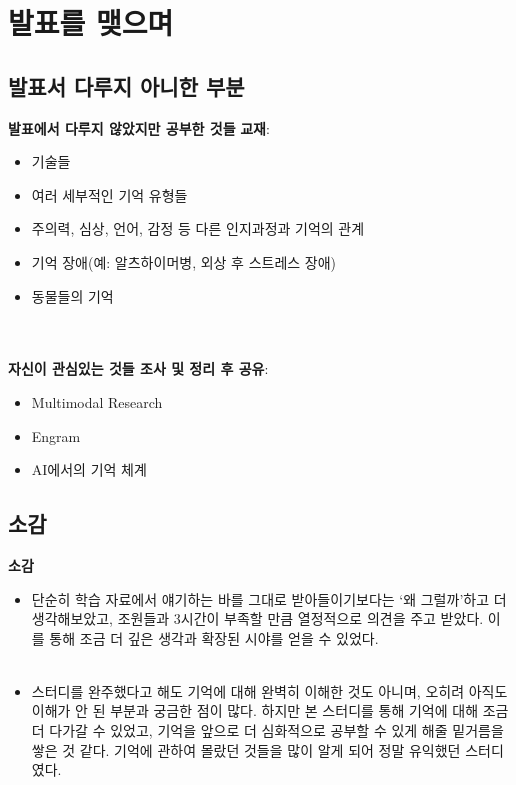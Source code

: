 \documentclass{beamer}
\begin{document}
\section{발표를 맺으며}
\subsection{발표서 다루지 아니한 부분}
\begin{frame}{\textbf{발표에서 다루지 않았지만 공부한 것들}}
  \large
  \textbf{교재}:
  \begin{itemize}
    \item 기술들
    \item 여러 세부적인 기억 유형들
    \item 주의력, 심상, 언어, 감정 등 다른 인지과정과 기억의 관계
    \item 기억 장애(예: 알츠하이머병, 외상 후 스트레스 장애)
    \item 동물들의 기억
  \end{itemize}\\~\\

  \textbf{자신이 관심있는 것들 조사 및 정리 후 공유}:
  \begin{itemize}
    \item Multimodal Research
    \item Engram
    \item AI에서의 기억 체계
  \end{itemize}
\end{frame}

\subsection{소감}
\begin{frame}{\textbf{소감}}
  \begin{itemize}
    \large
    \item 단순히 학습 자료에서 얘기하는 바를 그대로 받아들이기보다는 `왜 그럴까'하고 더 생각해보았고, 조원들과 3시간이 부족할 만큼 열정적으로 의견을 주고 받았다. 
      이를 통해 조금 더 깊은 생각과 확장된 시야를 얻을 수 있었다.\\~\\
    \item 스터디를 완주했다고 해도 기억에 대해 완벽히 이해한 것도 아니며, 오히려 아직도 이해가 안 된 부분과 궁금한 점이 많다. 하지만 본 스터디를 통해 기억에 대해 조금 더 다가갈 수 있었고, 기억을 앞으로 더 심화적으로 공부할 수 있게 해줄 밑거름을 쌓은 것 같다. 기억에 관하여 몰랐던 것들을 많이 알게 되어 정말 유익했던 스터디였다.
  \end{itemize}
\end{frame}
\end{document}
